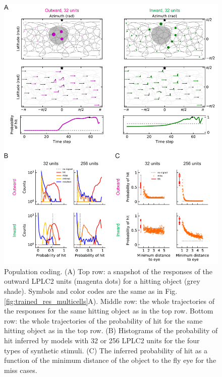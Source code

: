 \documentclass[9pt,lineno]{elife}
\begin{document}
\begin{figure}
\label{fig:compare_single}
\end{figure}

\begin{figure}
\includegraphics[width=\linewidth]{figures/compare_outward_inward_multiple_units_paper.pdf}
\caption{Population coding. (A) Top row: a snapshot of the responses of the outward LPLC2 units (magenta dots) for a hitting object (grey shade). Symbols and color codes are the same as in Fig. \ref{fig:trained_res_multicells}A). Middle row: the whole trajectories of the responses for the same hitting object as in the top row. Bottom row: the whole trajectories of the probability of hit for the same hitting object as in the top row. (B) Histograms of the probability of hit inferred by models with 32 or 256 LPLC2 units for the four types of synthetic stimuli. (C) The inferred probability of hit as a function of the minimum distance of the object to the fly eye for the miss cases.}

\end{figure}
\end{document}
